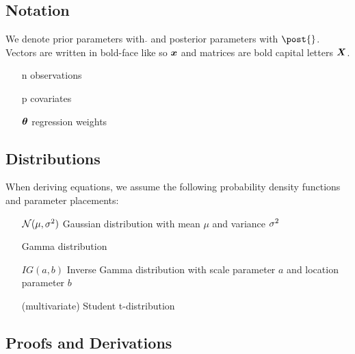 \subsection*{Notation}

We denote prior parameters with $\breve{}$ and posterior parameters with $\post{}$. Vectors are written in bold-face like so $\bm{x}$ and matrices are bold capital letters $\bm{X}$.

\begin{itemize}
    \item[n] observations
    \item[p] covariates
    \item[$\bm{\theta}$] regression weights
    \item[] 
\end{itemize}



\subsection*{Distributions}

When deriving equations, we assume the following probability density functions and parameter placements:

\begin{itemize}
    \item[$\mathcal{N}(\mu, \sigma^2)$] Gaussian distribution with mean $\mu$ and variance $\sigma^2$
    \item[] Gamma distribution
    \item[$IG(a, b)$] Inverse Gamma distribution with scale parameter $a$ and location parameter $b$
    \item[]  (multivariate) Student t-distribution
    \item[] 
\end{itemize}

\subsection*{Proofs and Derivations}

